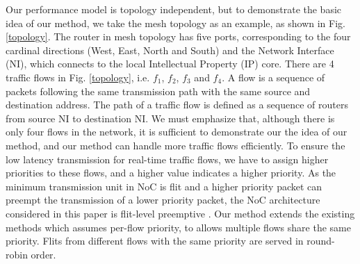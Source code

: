 \documentclass[10pt,journal]{IEEEtran}
\begin{document}
Our performance model is topology independent, but to demonstrate the basic idea of our method, we take the mesh topology as an example, as shown in Fig. \ref{topology}. The router in mesh topology has five ports, corresponding to the four cardinal directions (West, East, North and South) and the Network Interface (NI), which connects to the local Intellectual Property (IP) core. There are 4 traffic flows in Fig. \ref{topology}, i.e. $f_1$, $f_2$, $f_3$ and $f_4$. A flow is a sequence of packets following the same transmission path with the same source and destination address. The path of a traffic flow is defined as a sequence of routers from source NI to destination NI. We must emphasize that, although there is only four flows in the network, it is sufficient to demonstrate our the idea of our method, and our method can handle more traffic flows efficiently. To ensure the low latency transmission for real-time traffic flows, we have to assign higher priorities to these flows, and a higher value indicates a higher priority. As the minimum transmission unit in NoC is flit and a higher priority packet can preempt the transmission of a lower priority packet, the NoC architecture considered in this paper is flit-level preemptive \cite{Lee:2003:RWC:846077.846083}. Our method extends the existing methods \cite{73}\cite{Qian489900} which assumes per-flow priority, to allows multiple flows share the same priority. Flits from different flows with the same priority are served in round-robin order.
\end{document}
